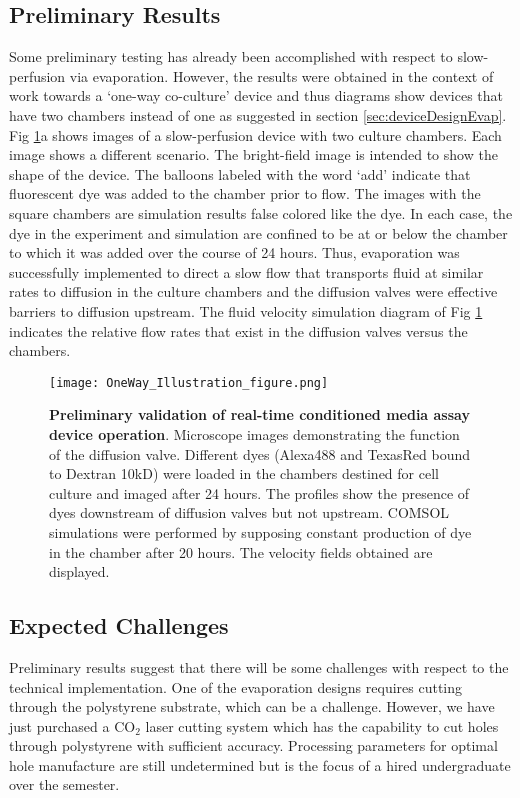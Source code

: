 \subsection{Preliminary Results} \label{sec:prelimCCResults}

Some preliminary testing has already been accomplished with respect to slow-perfusion via evaporation. However, the results were obtained in the context of work towards a `one-way co-culture' device and thus diagrams show devices that have two chambers instead of one as suggested in section \ref{sec:deviceDesignEvap}. Fig \ref{fig:oneWayDye}a shows images of a slow-perfusion device with two culture chambers. Each image shows a different scenario. The bright-field image is intended to show the shape of the device. The balloons labeled with the word `add' indicate that fluorescent dye was added to the chamber prior to flow. The images with the square chambers are simulation results false colored like the dye. In each case, the dye in the experiment and simulation are confined to be at or below the chamber to which it was added over the course of 24 hours. Thus, evaporation was successfully implemented to direct a slow flow that transports fluid at similar rates to diffusion in the culture chambers and the diffusion valves were effective barriers to diffusion upstream. The fluid velocity simulation diagram of Fig \ref{fig:oneWayDye} indicates the relative flow rates that exist in the diffusion valves versus the chambers.

\begin{figure}[!ht]
\begin{center}
\texttt{[image: OneWay\_Illustration\_figure.png]}
\caption{\textbf{Preliminary validation of real-time conditioned media assay device operation}. Microscope images demonstrating the function of the diffusion valve. Different dyes (Alexa488 and TexasRed bound to Dextran 10kD) were loaded in the chambers destined for cell culture and imaged after 24 hours. The profiles show the presence of dyes downstream of diffusion valves but not upstream. COMSOL simulations were performed by supposing constant production of dye in the chamber after 20 hours. The velocity fields obtained are displayed.}
\label{fig:oneWayDye}
\end{center}
\end{figure}

\subsection{Expected Challenges}
Preliminary results suggest that there will be some challenges with respect to the technical implementation. One of the evaporation designs requires cutting through the polystyrene substrate, which can be a challenge. However, we have just purchased a CO$_{2}$ laser cutting system which has the capability to cut holes through polystyrene with sufficient accuracy. Processing parameters for optimal hole manufacture are still undetermined but is the focus of a hired undergraduate over the semester.

